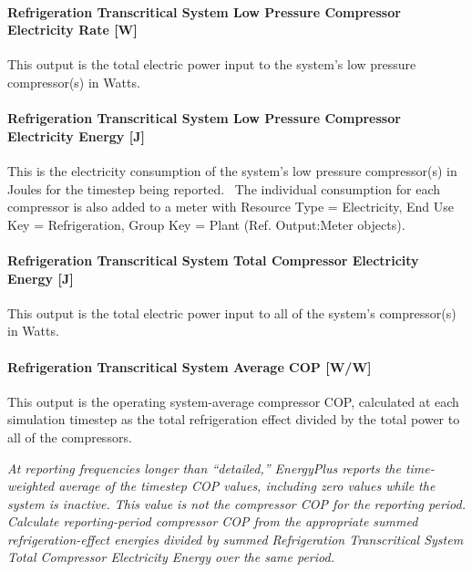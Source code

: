 \paragraph{Refrigeration Transcritical System Low Pressure Compressor Electricity Rate {[}W{]}}\label{refrigeration-transcritical-system-low-pressure-compressor-electric-power-w}

This output is the total electric power input to the system's low pressure compressor(s) in Watts.

\paragraph{Refrigeration Transcritical System Low Pressure Compressor Electricity Energy {[}J{]}}\label{refrigeration-transcritical-system-low-pressure-compressor-electric-energy-j}

This is the electricity consumption of the system's low pressure compressor(s) in Joules for the timestep being reported.~ The individual consumption for each compressor is also added to a meter with Resource Type = Electricity, End Use Key = Refrigeration, Group Key = Plant (Ref. Output:Meter objects).

\paragraph{Refrigeration Transcritical System Total Compressor Electricity Energy {[}J{]}}\label{refrigeration-transcritical-system-total-compressor-electric-energy-j}

This output is the total electric power input to all of the system's compressor(s) in Watts.

\paragraph{Refrigeration Transcritical System Average COP {[}W/W{]}}\label{refrigeration-transcritical-system-average-cop-ww}

This output is the operating system-average compressor COP, calculated at each simulation timestep as the total refrigeration effect divided by the total power to all of the compressors.

\emph{At reporting frequencies longer than ``detailed,'' EnergyPlus reports the time-weighted average of the timestep COP values, including zero values while the system is inactive. This value is not the compressor COP for the reporting period. Calculate reporting-period compressor COP from the appropriate summed refrigeration-effect energies divided by summed Refrigeration Transcritical System Total Compressor Electricity Energy over the same period.}

